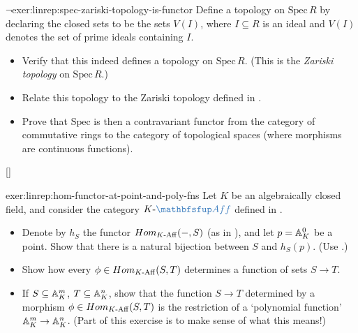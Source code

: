 \begin{exer}{$\lnot$}{exer:linrep:spec-zariski-topology-is-functor}
  Define a topology on $\mathrm{Spec}\,R$ by declaring the closed sets
  to be the sets $V(I)$, where $I \subseteq R$ is an ideal and $V(I)$
  denotes the set of prime ideals containing $I$.
  \begin{itemize}
  \item Verify that this indeed defines a topology on
    $\mathrm{Spec}\,R$. (This is the \emph{Zariski topology} on
    $\mathrm{Spec}\,R$.)
  \item Relate this topology to the Zariski topology defined in
    .
  \item Prove that $\mathrm{Spec}$ is then a contravariant functor
    from the category of commutative rings to the category of
    topological spaces (where morphisms are continuous functions).
  \end{itemize} []
\end{exer}

\begin{exer}{}{exer:linrep:hom-functor-at-point-and-poly-fns}
  Let $K$ be an algebraically closed field, and consider the category
  $K\text{-}\categ{Aff}$ defined in .
  \begin{itemize}
  \item Denote by $h_S$ the functor
    $Hom_{K\text{-}\mathrm{Aff}}(\mathord{-}, S)$ (as in
    ), and let
    $p = \mathbb{A}^0_K$ be a point. Show that there is a natural bijection
    between $S$ and $h_S(p)$. (Use
    .)
  \item Show how every $\phi \in Hom_{K\text{-}\mathrm{Aff}} (S, T)$
    determines a function of sets $S \to T$.
  \item If $S \subseteq \mathbb{A}^m_K$, $T \subseteq \mathbb{A}^n_K$, show that the
    function $S \to T$ determined by a morphism
    $\phi \in Hom_{K\text{-}\mathrm{Aff}}(S, T)$ is the restriction
    of a `polynomial function' $\mathbb{A}^m_K \to \mathbb{A}^n_K$. (Part of this
    exercise is to make sense of what this means!)
  \end{itemize}
\end{exer}

